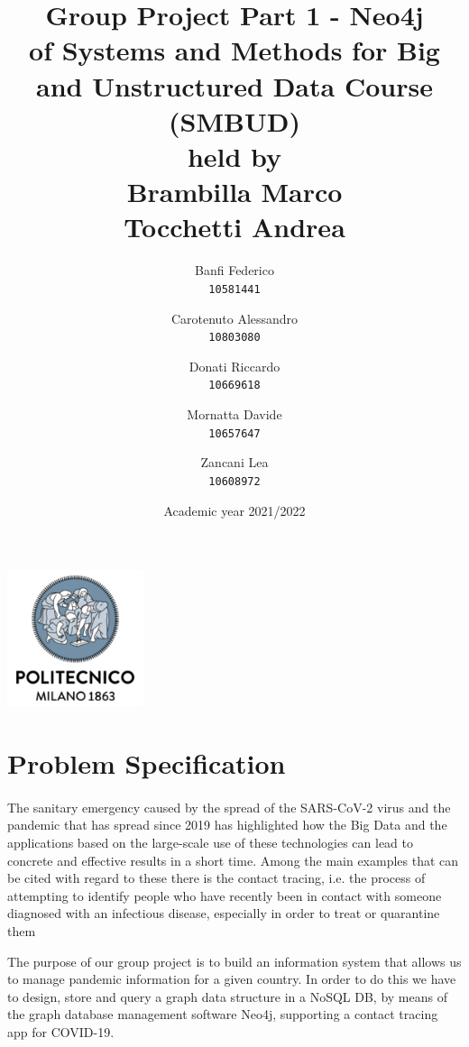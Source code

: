 \documentclass[a4paper,12pt]{article}
\begin{document}
\title{%
  Group Project Part 1 - Neo4j \\
  \large of Systems and Methods for Big
    and Unstructured Data Course \\(SMBUD)\\
    held by\\ Brambilla Marco\\ Tocchetti Andrea}
\author{Banfi Federico\\
  \texttt{10581441}
  \and
  Carotenuto Alessandro\\
  \texttt{10803080}
  \and
  Donati Riccardo\\
  \texttt{10669618}
  \and
  Mornatta Davide\\
  \texttt{10657647}
  \and
  Zancani Lea\\
  \texttt{10608972}}
\date{Academic year 2021/2022}
\maketitle
\begin{center}
  \includegraphics[width=4cm]{polilogo.png}\\
\end{center}
\newpage
\tableofcontents
\newpage

\section{Problem Specification}
\paragraph{}The sanitary emergency caused by the spread of the SARS-CoV-2 virus and the pandemic that has spread since 2019 has highlighted how the Big Data and the applications based on the large-scale use of these technologies can lead to concrete and effective results in a short time. Among the main examples that can be cited with regard to these there is the contact tracing, i.e. the process of attempting to identify people who have recently been in contact with someone diagnosed with an infectious disease, especially in order to treat or quarantine them \par
The purpose of our group project is to build an information system that allows us to manage pandemic information for a given country. In order to do this we have to design, store and query a graph data structure in a NoSQL DB, by means of the graph database management software Neo4j, supporting a contact tracing app for COVID-19.
\end{document}
